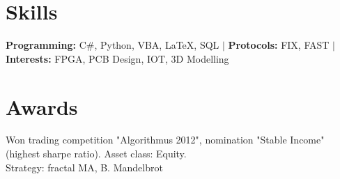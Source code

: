 \documentclass[a4paper,hidelinks]{article}
\newcommand{\resumeSubHeadingListStart}{\begin{itemize}[leftmargin=0.15in, label={}]}
\newcommand{\resumeSubHeadingListEnd}{\end{itemize}}
\begin{document}
\vspace{-9pt}
\section{Skills}
\resumeSubHeadingListStart
\small{\item{
              \textbf{Programming:}{ C\#, Python, VBA, \LaTeX, SQL} $|$ %
              \textbf{Protocols:}{ FIX, FAST} $|$ %
              \textbf{Interests:}{ FPGA, PCB Design, IOT, 3D Modelling} %
        }}
\resumeSubHeadingListEnd
\vspace{-11pt}
\section{Awards}
\begin{description}%
  \item{Won trading competition "Algorithmus 2012", nomination "Stable Income" (highest sharpe ratio). Asset class: Equity.\\Strategy: fractal MA, B. Mandelbrot}
  \vspace{-5pt}
\end{description}
\end{document}
